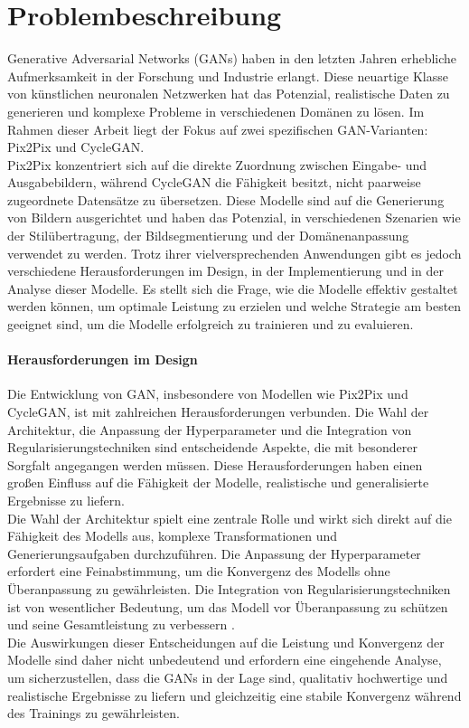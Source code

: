 \chapter{Problembeschreibung}
Generative Adversarial Networks (GANs) haben in den letzten Jahren erhebliche Aufmerksamkeit in der Forschung und Industrie erlangt. Diese neuartige Klasse von künstlichen neuronalen Netzwerken hat das Potenzial, realistische Daten zu generieren und komplexe Probleme in verschiedenen Domänen zu lösen. Im Rahmen dieser Arbeit liegt der Fokus auf zwei spezifischen GAN-Varianten: Pix2Pix und CycleGAN. 
\\
Pix2Pix konzentriert sich auf die direkte Zuordnung zwischen Eingabe- und Ausgabebildern, während CycleGAN die Fähigkeit besitzt, nicht paarweise zugeordnete Datensätze zu übersetzen. 
Diese Modelle sind auf die Generierung von Bildern ausgerichtet und haben das Potenzial, in verschiedenen Szenarien wie der Stilübertragung, der Bildsegmentierung und der Domänenanpassung verwendet zu werden. Trotz ihrer vielversprechenden Anwendungen gibt es jedoch verschiedene Herausforderungen im Design, in der Implementierung und in der Analyse dieser Modelle. Es stellt sich die Frage, wie die Modelle effektiv gestaltet werden können, um optimale Leistung zu erzielen und welche Strategie am besten geeignet sind, um die Modelle erfolgreich zu trainieren und zu evaluieren. 

\subsubsection{Herausforderungen im Design}
Die Entwicklung von GAN, insbesondere von Modellen wie Pix2Pix und CycleGAN, ist mit zahlreichen Herausforderungen verbunden. Die Wahl der Architektur, die Anpassung der Hyperparameter und die Integration von Regularisierungstechniken sind entscheidende Aspekte, die mit besonderer Sorgfalt angegangen werden müssen. Diese Herausforderungen haben einen großen Einfluss auf die Fähigkeit der Modelle, realistische und generalisierte Ergebnisse zu liefern.
\\
Die Wahl der Architektur spielt eine zentrale Rolle und wirkt sich direkt auf die Fähigkeit des Modells aus, komplexe Transformationen und Generierungsaufgaben durchzuführen. Die Anpassung der Hyperparameter erfordert eine Feinabstimmung, um die Konvergenz des Modells ohne Überanpassung zu gewährleisten. Die Integration von Regularisierungstechniken ist von wesentlicher Bedeutung, um das Modell vor Überanpassung zu schützen und seine Gesamtleistung zu verbessern \cite{Saxena.2021}.
\\
Die Auswirkungen dieser Entscheidungen auf die Leistung und Konvergenz der Modelle sind daher nicht unbedeutend und erfordern eine eingehende Analyse, um sicherzustellen, dass die GANs in der Lage sind, qualitativ hochwertige und realistische Ergebnisse zu liefern und gleichzeitig eine stabile Konvergenz während des Trainings zu gewährleisten.

